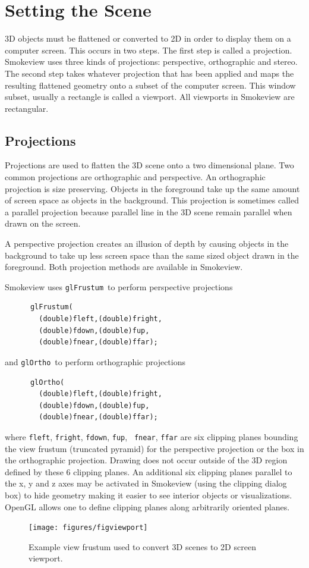 \documentclass[11pt,twoside]{book}
\begin{document}
\chapter{Setting the Scene}
3D objects must be flattened or converted to 2D in order to display them on a computer screen.  This occurs in two steps.  The first step is called a projection.  Smokeview uses three kinds of projections: perspective, orthographic and stereo.  The second step takes whatever projection that has been applied and maps the resulting flattened geometry onto a subset of the computer screen.  This window subset, usually a rectangle is called a viewport.  All viewports in Smokeview are rectangular.

\section{Projections}
Projections are used to flatten the 3D scene onto a two dimensional plane. Two common projections are orthographic and perspective. An orthographic projection is size preserving. Objects in the foreground take up the same amount of screen space as objects in the background. 
This projection is sometimes called a parallel projection because parallel line in the 3D scene remain parallel when drawn on the screen.

A perspective
projection creates an illusion of depth by causing objects in the background to take up less screen space than the same sized object drawn in the foreground.  Both projection methods are available in Smokeview.

Smokeview uses {\tt glFrustum}\ to perform perspective projections
\begin{verbatim}
      glFrustum(
        (double)fleft,(double)fright,
        (double)fdown,(double)fup,
        (double)fnear,(double)ffar);
\end{verbatim}
and {\tt glOrtho}\ to perform orthographic projections
\begin{verbatim}
      glOrtho(
        (double)fleft,(double)fright,
        (double)fdown,(double)fup,
        (double)fnear,(double)ffar);
\end{verbatim}

\noindent where {\tt fleft}, {\tt fright}, {\tt fdown}, {\tt fup}, {\tt
fnear}, {\tt ffar} are six clipping planes bounding the view
frustum (truncated pyramid) for the perspective projection or the
box in the orthographic projection.  Drawing does not occur
outside of the 3D region defined by these 6 clipping planes. An
additional six clipping planes parallel to the x, y and z axes may
be activated in Smokeview (using the clipping dialog box) to hide
geometry making it easier to see interior objects or
visualizations.  OpenGL allows one to define clipping planes along
arbitrarily oriented planes.
\begin{figure}[t]
\begin{center}
\texttt{[image: figures/figviewport]}
\end{center}
\caption{Example view frustum used to convert 3D scenes to 2D
screen viewport.}
 \label{figfrustum}
\end{figure}
\end{document}
